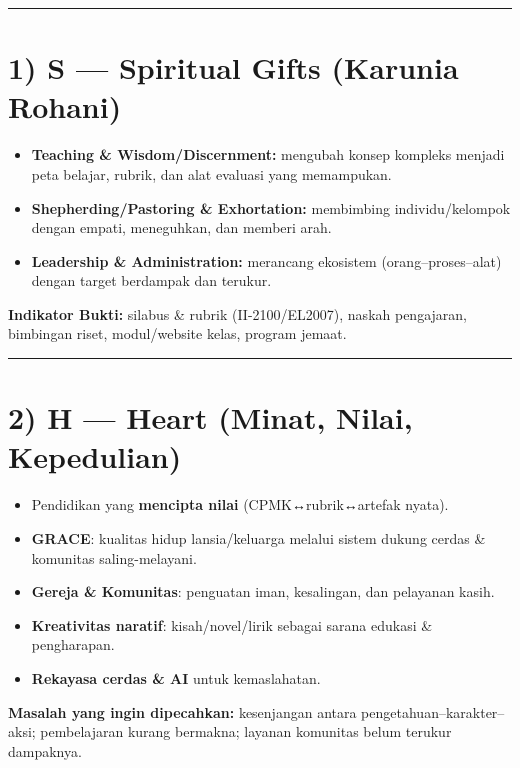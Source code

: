 \documentclass[
  letterpaper,
  DIV=11,
  numbers=noendperiod]{scrreprt}
\providecommand{\tightlist}{%
  \setlength{\itemsep}{0pt}\setlength{\parskip}{0pt}}
\begin{document}
\begin{center}\rule{0.5\linewidth}{0.5pt}\end{center}

\section{1) S --- Spiritual Gifts (Karunia
Rohani)}\label{s-spiritual-gifts-karunia-rohani}

\begin{itemize}
\tightlist
\item
  \textbf{Teaching \& Wisdom/Discernment:} mengubah konsep kompleks
  menjadi peta belajar, rubrik, dan alat evaluasi yang memampukan.
\item
  \textbf{Shepherding/Pastoring \& Exhortation:} membimbing
  individu/kelompok dengan empati, meneguhkan, dan memberi arah.
\item
  \textbf{Leadership \& Administration:} merancang ekosistem
  (orang--proses--alat) dengan target berdampak dan terukur.
\end{itemize}

\textbf{Indikator Bukti:} silabus \& rubrik (II-2100/EL2007), naskah
pengajaran, bimbingan riset, modul/website kelas, program jemaat.

\begin{center}\rule{0.5\linewidth}{0.5pt}\end{center}

\section{2) H --- Heart (Minat, Nilai,
Kepedulian)}\label{h-heart-minat-nilai-kepedulian}

\begin{itemize}
\tightlist
\item
  Pendidikan yang \textbf{mencipta nilai} (CPMK↔rubrik↔artefak nyata).
\item
  \textbf{GRACE}: kualitas hidup lansia/keluarga melalui sistem dukung
  cerdas \& komunitas saling-melayani.
\item
  \textbf{Gereja \& Komunitas}: penguatan iman, kesalingan, dan
  pelayanan kasih.
\item
  \textbf{Kreativitas naratif}: kisah/novel/lirik sebagai sarana edukasi
  \& pengharapan.
\item
  \textbf{Rekayasa cerdas \& AI} untuk kemaslahatan.
\end{itemize}

\textbf{Masalah yang ingin dipecahkan:} kesenjangan antara
pengetahuan--karakter--aksi; pembelajaran kurang bermakna; layanan
komunitas belum terukur dampaknya.
\end{document}
